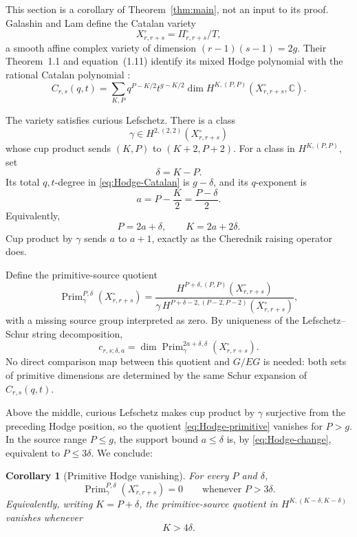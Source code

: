 \documentclass[11pt]{article}
\newtheorem{corollary}[theorem]{Corollary}
\newcommand{\C}{\mathbb{C}}
\newcommand{\Prim}{\operatorname{Prim}}
\begin{document}
This section is a corollary of Theorem~\ref{thm:main}, not an input to
its proof.  Galashin and Lam define the Catalan variety
\[
 X_{r,r+s}^{\circ}=\Pi_{r,r+s}^{\circ}/T,
\]
a smooth affine complex variety of dimension
$(r-1)(s-1)=2g$.  Their Theorem~1.1 and equation~(1.11) identify its
mixed Hodge polynomial with the rational Catalan polynomial
\cite{GalashinLam}:
\begin{equation}\label{eq:Hodge-Catalan}
 C_{r,s}(q,t)
 =\sum_{K,P}
 q^{P-K/2}t^{g-K/2}
 \dim H^{K,(P,P)}(X_{r,r+s}^{\circ},\C).
\end{equation}

The variety satisfies curious Lefschetz.  There is a class
\[
 \gamma\in H^{2,(2,2)}(X_{r,r+s}^{\circ})
\]
whose cup product sends $(K,P)$ to $(K+2,P+2)$.  For a class in
$H^{K,(P,P)}$, set
\[
 \delta=K-P.
\]
Its total $q,t$-degree in \eqref{eq:Hodge-Catalan} is $g-\delta$, and
its $q$-exponent is
\[
 a=P-\frac K2=\frac{P-\delta}{2}.
\]
Equivalently,
\begin{equation}\label{eq:Hodge-change}
 P=2a+\delta,
 \qquad
 K=2a+2\delta.
\end{equation}
Cup product by $\gamma$ sends $a$ to $a+1$, exactly as the Cherednik
raising operator does.

Define the primitive-source quotient
\begin{equation}\label{eq:Hodge-primitive}
 \Prim_\gamma^{P,\delta}(X_{r,r+s}^{\circ})
 =
 \frac{H^{P+\delta,(P,P)}(X_{r,r+s}^{\circ})}
 {\gamma\,H^{P+\delta-2,(P-2,P-2)}(X_{r,r+s}^{\circ})},
\end{equation}
with a missing source group interpreted as zero.  By uniqueness of the
Lefschetz--Schur string decomposition,
\begin{equation}\label{eq:c-Hodge-primitive}
 c_{r,s;\delta,a}
 =\dim\Prim_\gamma^{2a+\delta,\delta}
 (X_{r,r+s}^{\circ}).
\end{equation}
No direct comparison map between this quotient and $G/EG$ is needed:
both sets of primitive dimensions are determined by the same Schur
expansion of $C_{r,s}(q,t)$.

Above the middle, curious Lefschetz makes cup product by $\gamma$
surjective from the preceding Hodge position, so the quotient
\eqref{eq:Hodge-primitive} vanishes for $P>g$.  In the source range
$P\leq g$, the support bound $a\leq\delta$ is, by
\eqref{eq:Hodge-change}, equivalent to $P\leq3\delta$.  We conclude:

\begin{corollary}[Primitive Hodge vanishing]\label{cor:Hodge-vanishing}
For every $P$ and $\delta$,
\begin{equation}\label{eq:Hodge-vanishing}
 \Prim_\gamma^{P,\delta}(X_{r,r+s}^{\circ})=0
 \qquad\text{whenever }P>3\delta.
\end{equation}
Equivalently, writing $K=P+\delta$, the primitive-source quotient in
$H^{K,(K-\delta,K-\delta)}$ vanishes whenever
\begin{equation}\label{eq:Hodge-vanishing-K}
 K>4\delta.
\end{equation}
\end{corollary}
\end{document}
